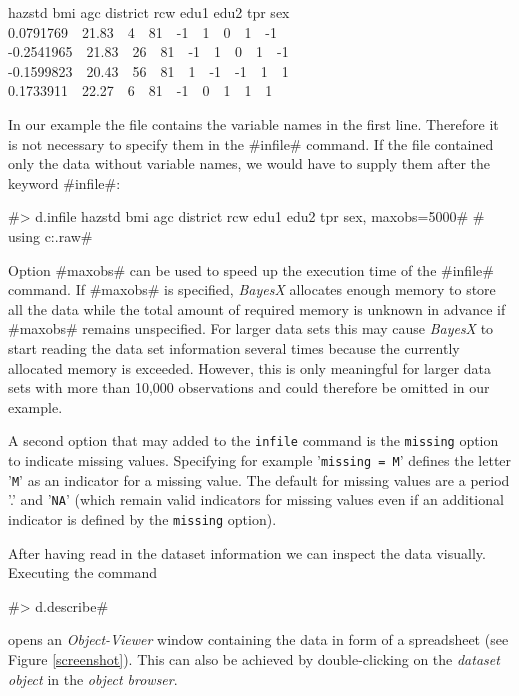 \documentclass{article}
\begin{document}
{\footnotesize
 hazstd bmi agc district rcw edu1 edu2 tpr sex\\
 0.0791769 \,\, 21.83 \,\, 4 \,\, 81 \,\, -1 \,\, 1 \,\, 0 \,\, 1 \,\, -1\\
 -0.2541965 \,\, 21.83 \,\, 26 \,\, 81 \,\, -1 \,\, 1 \,\, 0 \,\, 1 \,\, -1\\
 -0.1599823 \,\, 20.43 \,\, 56 \,\, 81 \,\, 1 \,\, -1 \,\, -1 \,\, 1 \,\, 1\\
 0.1733911 \,\, 22.27 \,\, 6 \,\, 81 \,\, -1 \,\, 0 \,\, 1 \,\, 1 \,\, 1}

In our example the file contains the variable names in the first
line. Therefore it is not necessary to specify them in the
#infile# command. If the file contained only the data without
variable names, we would have to supply them after the keyword
#infile#:

 #> d.infile hazstd bmi agc district rcw edu1 edu2 tpr sex, maxobs=5000#
 #  using c:\data\zambia.raw#


Option #maxobs# can be used to speed up the execution time of the
#infile# command. If #maxobs# is specified, {\it BayesX} allocates
enough memory to store all the data while the total amount of
required memory is unknown in advance if #maxobs# remains
unspecified. For larger data sets this may cause {\it BayesX} to
start reading the data set information several times because the
currently allocated memory is exceeded. However, this is only
meaningful for larger data sets with more than 10,000 observations
and could therefore be omitted in our example.

A second option that may added to the {\tt infile} command is the
{\tt missing} option to indicate missing values. Specifying for
example '{\tt missing = M}' defines the letter '{\tt M}' as an
indicator for a missing value. The default for missing values are
a period '.' and '{\tt NA}' (which remain valid indicators for
missing values even if an additional indicator is defined by the
{\tt missing} option).

After having read in the dataset information we can inspect the
data visually. Executing the command

#> d.describe#

opens an {\it Object-Viewer} window containing the data in form of
a spreadsheet (see Figure \ref{screenshot}). This can also be
achieved by double-clicking on the {\it dataset object} in the
{\it object browser}.

\vspace{1cm}
\end{document}
